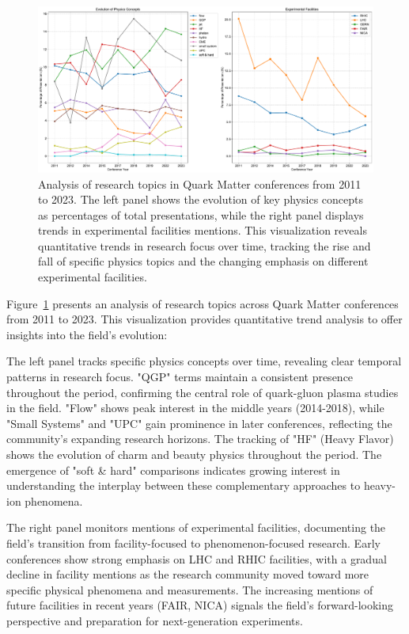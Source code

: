 \documentclass[a4paper,11pt]{article}
\begin{document}
\begin{figure}[H]
\centering
\includegraphics[width=\textwidth]{figures/QM_keyword_analysis.pdf}
\caption{Analysis of research topics in Quark Matter conferences from 2011 to 2023. The left panel shows the evolution of key physics concepts as percentages of total presentations, while the right panel displays trends in experimental facilities mentions. This visualization reveals quantitative trends in research focus over time, tracking the rise and fall of specific physics topics and the changing emphasis on different experimental facilities.}
\label{fig:keywords}
\end{figure}

Figure~\ref{fig:keywords} presents an analysis of research topics across Quark Matter conferences from 2011 to 2023. This visualization provides quantitative trend analysis to offer insights into the field's evolution:

The left panel tracks specific physics concepts over time, revealing clear temporal patterns in research focus. "QGP" terms maintain a consistent presence throughout the period, confirming the central role of quark-gluon plasma studies in the field. "Flow" shows peak interest in the middle years (2014-2018), while "Small Systems" and "UPC" gain prominence in later conferences, reflecting the community's expanding research horizons. The tracking of "HF" (Heavy Flavor) shows the evolution of charm and beauty physics throughout the period. The emergence of "soft \& hard" comparisons indicates growing interest in understanding the interplay between these complementary approaches to heavy-ion phenomena.

The right panel monitors mentions of experimental facilities, documenting the field's transition from facility-focused to phenomenon-focused research. Early conferences show strong emphasis on LHC and RHIC facilities, with a gradual decline in facility mentions as the research community moved toward more specific physical phenomena and measurements. The increasing mentions of future facilities in recent years (FAIR, NICA) signals the field's forward-looking perspective and preparation for next-generation experiments.
\end{document}
